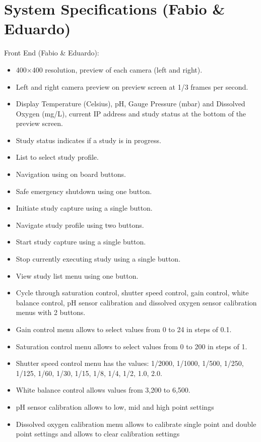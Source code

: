 \section{System Specifications (Fabio \& Eduardo)}
Front End (Fabio \& Eduardo):
\begin{itemize}
	\item 400$\times$400 resolution, preview of each camera (left and right).
	\item Left and right camera preview on preview screen at 1/3 frames per second.
	\item Display Temperature (Celsius), pH, Gauge Pressure (mbar) and Dissolved Oxygen (mg/L), current IP address and study status at the bottom of the preview screen.
	\item Study status indicates if a study is in progress.
	\item List to select study profile.
	\item Navigation using on board buttons.
	\item Safe emergency shutdown using one button.
	\item Initiate study capture using a single button.
	\item Navigate study profile using two buttons.
	\item Start study capture using a single button.
	\item Stop currently executing study using a single button.
	\item View study list menu using one button.
	\item Cycle through saturation control, shutter speed control, gain control, white balance control, pH sensor calibration and dissolved oxygen sensor calibration menus with 2 buttons.
	\item Gain control menu allows to select values from 0 to 24 in steps of 0.1.
	\item Saturation control menu allows to select values from 0 to 200 in steps of 1.
	\item Shutter speed control menu has the values: 1/2000, 1/1000, 1/500, 1/250, 1/125, 1/60, 1/30, 1/15, 1/8, 1/4, 1/2, 1.0, 2.0.
	\item White balance control allows values from 3,200 to 6,500.
	\item pH sensor calibration allows to low, mid and high point settings
	\item Dissolved oxygen calibration menu allows to calibrate single point and double point settings and allows to clear calibration settings
\end{itemize}
